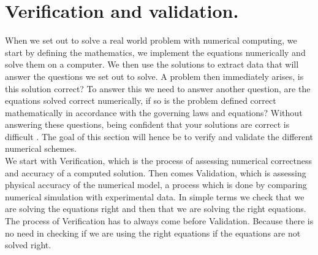 \chapter{Verification and validation. }
When we set out to solve a real world problem with numerical computing, we start by defining the mathematics, we implement the equations numerically and solve them on a computer. We then use the solutions to extract data that will answer the questions we set out to solve. A problem then immediately arises, is this solution correct? To answer this we need to answer another question, are the equations solved correct numerically, if so is the problem defined correct mathematically in accordance with the governing laws and equations?
Without answering these questions, being confident that your solutions are correct is difficult \cite{Selin2014}. The goal of this section will hence be to verify and validate the different numerical schemes. \\
We start with Verification, which is the process of assessing numerical correctness and accuracy of a computed solution. Then comes Validation, which is assessing physical accuracy of the numerical model, a process which is done by comparing numerical simulation with experimental data. In simple terms we check that we are solving the equations right and then that we are solving the right equations. The process of Verification has to always come before Validation. Because there is no need in checking if we are using the right equations if the equations are not solved right. 

